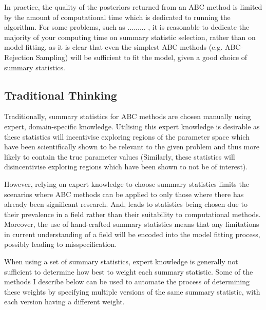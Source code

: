 \documentclass[11pt,a4paper]{article}
\theoremstyle{break}
\begin{document}
  \par In practice, the quality of the posteriors returned from an ABC method is limited by the amount of computational time which is dedicated to running the algorithm. For some problems, such as ......... %
  , it is reasonable to dedicate the majority of your computing time on summary statistic selection, rather than on model fitting, as it is clear that even the simplest ABC methods (e.g. ABC-Rejection Sampling) will be sufficient to fit the model, given a good choice of summary statistics.

  \subsection*{Traditional Thinking}\label{sec_summary_stats_traditional_thinking}

  \par Traditionally, summary statistics for ABC methods are chosen manually using expert, domain-specific knowledge. Utilising this expert knowledge is desirable as these statistics will incentivise exploring regions of the parameter space which have been scientifically shown to be relevant to the given problem and thus more likely to contain the true parameter values (Similarly, these statistics will disincentivise exploring regions which have been shown to not be of interest). %


  \par However, relying on expert knowledge to choose summary statistics limits the scenarios where ABC methods can be applied to only those where there has already been significant research. And, leads to statistics being chosen due to their prevalence in a field rather than their suitability to computational methods. Moreover, the use of hand-crafted summary statistics means that any limitations in current understanding of a field will be encoded into the model fitting process, possibly leading to misspecification.

  \par When using a set of summary statistics, expert knowledge is generally not sufficient to determine how best to weight each summary statistic. Some of the methods I describe below can be used to automate the process of determining these weights by specifying multiple versions of the same summary statistic, with each version having a different weight. %
\end{document}
